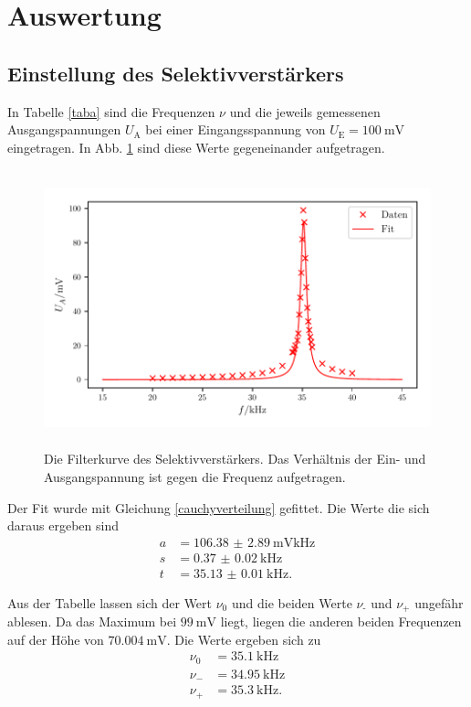 \section{Auswertung}
\label{sec:Auswertung}

\subsection{Einstellung des Selektivverstärkers}
In Tabelle \ref{taba} sind die Frequenzen $\nu$ und die jeweils gemessenen Ausgangspannungen $U_\text{A}$ 
bei einer Eingangsspannung von $U_\text{E} = \SI{100}{\milli\volt}$ eingetragen. 
In Abb. \ref{plota} sind diese Werte gegeneinander aufgetragen.



\begin{figure}
    \centering
    \includegraphics[width=15cm, height=8cm]{build/plota2.pdf} %
    \caption{Die Filterkurve des Selektivverstärkers. Das Verhältnis der Ein- und Ausgangspannung
    ist gegen die Frequenz aufgetragen.}
    \label{plota}
\end{figure}

Der Fit wurde mit Gleichung \eqref{cauchyverteilung} gefittet. Die Werte die sich daraus ergeben sind
\begin{align*} 
  a &= \SI{106.38(289)}{\milli\volt\kilo\hertz} \\
  s &= \SI{0.37(2)}{\kilo\hertz} \\
  t &= \SI{35.13(1)}{\kilo\hertz}. 
\end{align*}


\noindent Aus der Tabelle lassen sich der Wert $\nu_0$ und die beiden Werte $\nu_\text{-}$ und $\nu_\text{+}$ ungefähr ablesen.
Da das Maximum bei $\SI{99}{\milli\volt}$ liegt, liegen die anderen beiden Frequenzen auf der Höhe von $\SI{70.004}{\milli\volt}$.
Die Werte ergeben sich zu 
\begin{align*} 
 \nu_0 &= \SI{35.1}{\kilo\hertz} \\
 \nu_{-} &= \SI{34.95}{\kilo\hertz} \\
 \nu_{+} &= \SI{35.3}{\kilo\hertz}. 
\end{align*}

